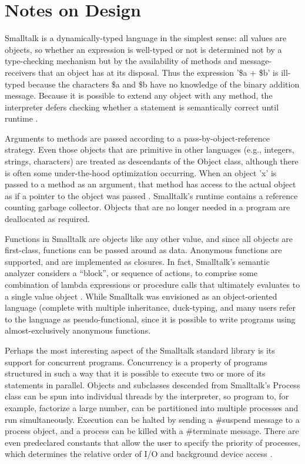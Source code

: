 \section{Notes on Design}

Smalltalk is a dynamically-typed language in the simplest sense: all
values are objects, so whether an expression is well-typed or not is
determined not by a type-checking mechanism but by the availability of
methods and message-receivers that an object has at its disposal. Thus
the expression '\$a + \$b' is ill-typed because the characters \$a and
\$b have no knowledge of the binary addition message. Because it is
possible to extend any object with any method, the interpreter defers
checking whether a statement is semantically correct until runtime
\cite{thebluebook}.

Arguments to methods are passed according to a
pass-by-object-reference strategy. Even those objects that are
primitive in other languages (e.g., integers, strings, characters) are
treated as descendants of the Object class, although there is often
some under-the-hood optimization occurring. When an object 'x' is
passed to a method as an argument, that method has access to the
actual object as if a pointer to the object was passed
\cite{postcard}. Smalltalk's runtime contains a reference counting
garbage collector. Objects that are no longer needed in a program are
deallocated as required.

Functions in Smalltalk are objects like any other value, and since all
objects are first-class, functions can be passed around as
data. Anonymous functions are supported, and are implemented as
closures. In fact, Smalltalk's semantic analyzer considers a
``block'', or sequence of actions, to comprise some combination of
lambda expressions or procedure calls that ultimately evaluates to a
single value object \cite{postcard}. While Smalltalk was envisioned as
an object-oriented language (complete with multiple inheritance,
duck-typing, and  many users refer to the language as pseudo-functional,
since it is possible to write programs using almost-exclusively
anonymous functions.

Perhaps the most interesting aspect of the Smalltalk standard library
is its support for concurrent programs. Concurrency is a property of
programs structured in such a way that it is possible to execute two
or more of its statements in parallel. Objects and subclasses
descended from Smalltalk's Process class can be spun into individual
threads by the interpreter, so program to, for example, factorize a
large number, can be partitioned into multiple processes and run
simultaneously. Execution can be halted by sending a \#suspend message
to a process object, and a process can be killed with a \#terminate
message. There are even predeclared constants that allow the user to
specify the priority of processes, which determines the relative order
of I/O and background device access \cite{postcard}.

